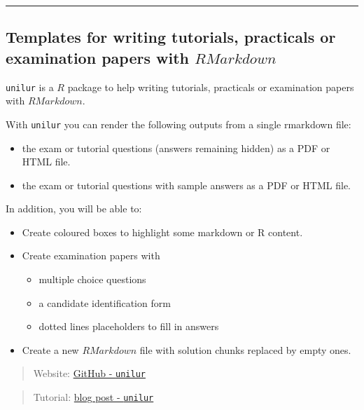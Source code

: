 \documentclass[]{book}
\providecommand{\tightlist}{%
  \setlength{\itemsep}{0pt}\setlength{\parskip}{0pt}}
\theoremstyle{definition}
\theoremstyle{definition}
\theoremstyle{definition}
\theoremstyle{remark}
\begin{document}
\begin{center}\rule{0.5\linewidth}{\linethickness}\end{center}

\subsection{\texorpdfstring{Templates for writing tutorials, practicals
or examination papers with
\(R Markdown\)}{Templates for writing tutorials, practicals or examination papers with R Markdown}}\label{templates-for-writing-tutorials-practicals-or-examination-papers-with-r-markdown}

\texttt{unilur} is a \(R\) package to help writing tutorials, practicals
or examination papers with \(R Markdown\).

With \texttt{unilur} you can render the following outputs from a single
rmarkdown file:

\begin{itemize}
\item
  the exam or tutorial questions (answers remaining hidden) as a PDF or
  HTML file.
\item
  the exam or tutorial questions with sample answers as a PDF or HTML
  file.
\end{itemize}

In addition, you will be able to:

\begin{itemize}
\item
  Create coloured boxes to highlight some markdown or R content.
\item
  Create examination papers with

  \begin{itemize}
  \tightlist
  \item
    multiple choice questions
  \item
    a candidate identification form
  \item
    dotted lines placeholders to fill in answers
  \end{itemize}
\item
  Create a new \(R Markdown\) file with solution chunks replaced by
  empty ones.
\end{itemize}

\begin{quote}
Website: \href{https://github.com/koncina/unilur}{GitHub -
\texttt{unilur}}
\end{quote}

\begin{quote}
Tutorial:
\href{http://eric.koncina.eu/posts/introducing-the-unilur-rmarkdown-template/}{blog
post - \texttt{unilur}}
\end{quote}
\end{document}
